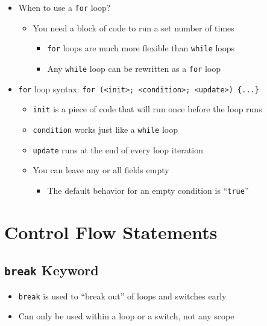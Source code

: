 \documentclass{article}
\begin{document}
\begin{itemize}
	\item When to use a \texttt{for} loop?
	\begin{itemize}
		\item You need a block of code to run a set number of times
		\begin{itemize}
			\item \texttt{for} loops are much more flexible than \texttt{while} loops
			\item Any \texttt{while} loop can be rewritten as a \texttt{for} loop
		\end{itemize} 
	\end{itemize}
	\item \texttt{for} loop syntax: \texttt{for (<init>; <condition>; <update>) \{...\}} 
	\begin{itemize}
		\item \texttt{init} is a piece of code that will run once before the loop runs
		\item \texttt{condition} works just like a \texttt{while} loop
		\item \texttt{update} runs at the end of every loop iteration
		\item You can leave any or all fields empty \begin{itemize}
			\item The default behavior for an empty condition is ``\texttt{true}''
		\end{itemize}
	\end{itemize}
	
\end{itemize}

\section{Control Flow Statements}

\subsection{\texttt{break} Keyword}

\begin{itemize}
	\item \texttt{break} is used to ``break out'' of loops and switches early
	\item Can only be used within a loop or a switch, not any scope
\end{itemize}


\end{document}
